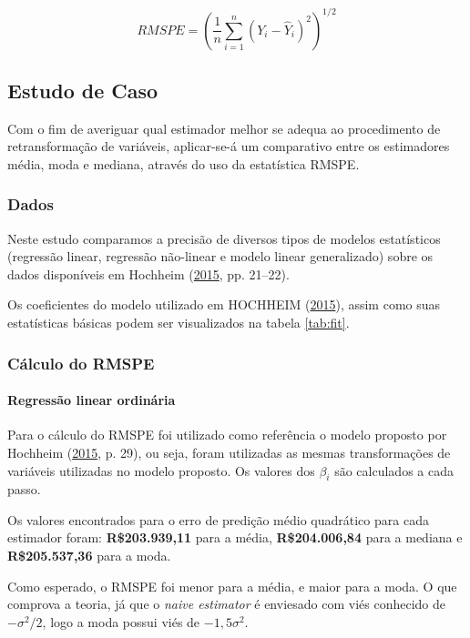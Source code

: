 \documentclass[a4paper, 12pt]{article}
\let\oldparagraph\paragraph
\renewcommand{\paragraph}[1]{\oldparagraph{#1}\mbox{}}
\begin{document}
\[RMSPE = (\frac{1}{n}\sum_{i = 1}^{n}(Y_i - \hat{Y}_i)^2)^{1/2}\]

\subsection{Estudo de Caso}\label{estudo-de-caso}

Com o fim de averiguar qual estimador melhor se adequa ao procedimento
de retransformação de variáveis, aplicar-se-á um comparativo entre os
estimadores média, moda e mediana, através do uso da estatística RMSPE.

\subsubsection{Dados}\label{dados}

Neste estudo comparamos a precisão de diversos tipos de modelos
estatísticos (regressão linear, regressão não-linear e modelo linear
generalizado) sobre os dados disponíveis em Hochheim
(\protect\hyperlink{ref-hochheim}{2015}, pp. 21--22).

Os coeficientes do modelo utilizado em HOCHHEIM
(\protect\hyperlink{ref-hochheim}{2015}), assim como suas estatísticas
básicas podem ser visualizados na tabela \ref{tab:fit}.

\subsubsection{Cálculo do RMSPE}\label{calculo-do-rmspe}

\paragraph{Regressão linear ordinária}\label{regressao-linear-ordinaria}

Para o cálculo do RMSPE foi utilizado como referência o modelo proposto
por Hochheim (\protect\hyperlink{ref-hochheim}{2015}, p. 29), ou seja,
foram utilizadas as mesmas transformações de variáveis utilizadas no
modelo proposto. Os valores dos \(\beta_i\) são calculados a cada passo.

Os valores encontrados para o erro de predição médio quadrático para
cada estimador foram: \textbf{R\$203.939,11} para a média,
\textbf{R\$204.006,84} para a mediana e \textbf{R\$205.537,36} para a
moda.

Como esperado, o RMSPE foi menor para a média, e maior para a moda. O
que comprova a teoria, já que o \emph{naive estimator} é enviesado com
viés conhecido de \(-\sigma^2/2\), logo a moda possui viés de
\(-1,5\sigma^2\).
\end{document}
